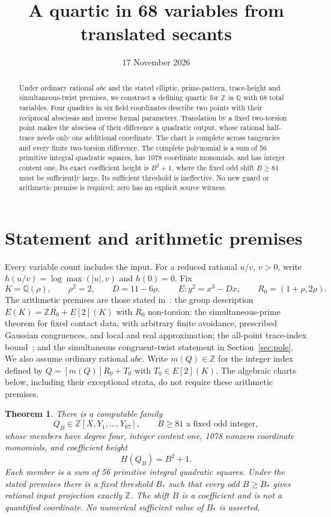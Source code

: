 \documentclass[11pt,a4paper]{article}
\title{A quartic in 68 variables from translated secants}
\author{}\date{17 November 2026}
\newtheorem{theorem}{Theorem}[section]
\newcommand{\Q}{\mathbb Q}\newcommand{\Z}{\mathbb Z}
\begin{document}
\maketitle
\begin{abstract}
Under ordinary rational $abc$ and the stated elliptic, prime-pattern,
trace-height and simultaneous-twist premises, we construct a defining
quartic for $\Z$ in $\Q$ with 68 total variables. Four quadrics in six
field coordinates describe two points with their reciprocal abscissas
and inverse formal parameters. Translation by a fixed two-torsion point
makes the abscissa of their difference a quadratic output, whose rational
half-trace needs only one additional coordinate. The chart is complete
across tangencies and every finite two-torsion difference. The complete
polynomial is a sum of 56 primitive integral quadratic squares, has 1078
coordinate monomials, and has integer content one. Its exact coefficient
height is $B^2+1$, where the fixed odd shift $B\ge81$ must be sufficiently
large. Its sufficient threshold is ineffective. No new guard or
arithmetic premise is required; zero has an explicit source witness.
\end{abstract}

\section{Statement and arithmetic premises}
Every variable count includes the input. For a reduced rational $u/v$,
$v>0$, write $h(u/v)=\log\max(|u|,v)$ and $h(0)=0$. Fix
\[
 K=\Q(\rho),\qquad \rho^2=2,\qquad D=11-6\rho,\qquad
 E:y^2=x^3-Dx,\qquad R_0=(1+\rho,2\rho).
\]
The arithmetic premises are those stated in~\cite{Arithmetic}: the
group description $E(K)=\Z R_0+E[2](K)$ with $R_0$ non-torsion;
the simultaneous-prime theorem for fixed contact data, with arbitrary
finite avoidance, prescribed Gaussian congruences, and local and real
approximation; the all-point trace-index bound~\cite{Trace}; and the
simultaneous congruent-twist statement in Section~\ref{sec:pole}.
We also assume ordinary rational $abc$. Write $m(Q)\in\Z$ for the
integer index defined by $Q=[m(Q)]R_0+T_0$ with $T_0\in E[2](K)$.
The algebraic charts below, including their exceptional strata,
do not require these arithmetic premises.

\begin{theorem}\label{thm:main}
There is a computable family
\[
 Q_B\in\Z[X,Y_1,\ldots,Y_{67}],\qquad
 B\ge81\text{ a fixed odd integer},
\]
whose members have degree four, integer content one, 1078 nonzero
coordinate monomials, and coefficient height
\[
                         H(Q_B)=B^2+1.
\]
Each member is a sum of 56 primitive integral quadratic squares.
Under the stated premises there is a fixed threshold $B_*$ such that
every odd $B\ge B_*$ gives rational input projection exactly $\Z$.
The shift $B$ is a coefficient and is not a quantified coordinate.
No numerical sufficient value of $B_*$ is asserted.
\end{theorem}
\end{document}
